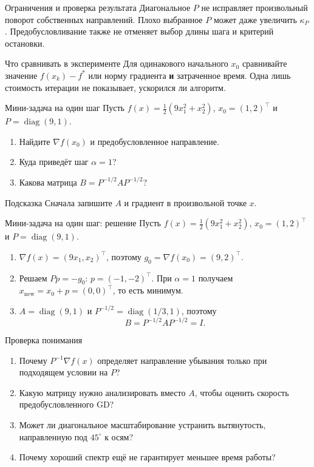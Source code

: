 \documentclass[aspectratio=169,10pt]{beamer}
\newcommand{\grad}{\nabla}
\begin{document}
\begin{frame}{Ограничения и проверка результата}
\small
Диагональное $P$ не исправляет произвольный поворот собственных направлений. Плохо выбранное $P$ может даже увеличить $\kappa_P$.
Предобусловливание также не отменяет выбор длины шага и критерий остановки.
\begin{alertblock}{Что сравнивать в эксперименте}
Для одинакового начального $x_0$ сравнивайте значение $f(x_k)-f^*$ или норму градиента \textbf{и} затраченное время. Одна лишь стоимость итерации не показывает, ускорился ли алгоритм.
\end{alertblock}
\end{frame}

\begin{frame}{Мини-задача на один шаг}
\small
Пусть $f(x)=\tfrac12(9x_1^2+x_2^2)$, $x_0=(1,2)^\top$ и $P=\operatorname{diag}(9,1)$.
\begin{enumerate}
\item Найдите $\grad f(x_0)$ и предобусловленное направление.
\item Куда приведёт шаг $\alpha=1$?
\item Какова матрица $B=P^{-1/2}AP^{-1/2}$?
\end{enumerate}
\begin{block}{Подсказка}
Сначала запишите $A$ и градиент в произвольной точке $x$.
\end{block}
\end{frame}

\begin{frame}{Мини-задача на один шаг: решение}
\small
Пусть $f(x)=\tfrac12(9x_1^2+x_2^2)$, $x_0=(1,2)^\top$ и $P=\operatorname{diag}(9,1)$.
\begin{enumerate}
\item $\nabla f(x)=(9x_1,x_2)^\top$, поэтому
$g_0=\nabla f(x_0)=(9,2)^\top$.
\item Решаем $Pp=-g_0$: $p=(-1,-2)^\top$.
При $\alpha=1$ получаем $x_{\mathrm{new}}=x_0+p=(0,0)^\top$, то есть минимум.
\item $A=\operatorname{diag}(9,1)$ и
$P^{-1/2}=\operatorname{diag}(1/3,1)$, поэтому
\[
B=P^{-1/2}AP^{-1/2}=I.
\]
\end{enumerate}
\end{frame}

\begin{frame}{Проверка понимания}
\small
\begin{enumerate}
\item Почему $P^{-1}\grad f(x)$ определяет направление убывания только при подходящем условии на $P$?
\item Какую матрицу нужно анализировать вместо $A$, чтобы оценить скорость предобусловленного GD?
\item Может ли диагональное масштабирование устранить вытянутость, направленную под $45^\circ$ к осям?
\item Почему хороший спектр ещё не гарантирует меньшее время работы?
\end{enumerate}
\end{frame}
\end{document}
